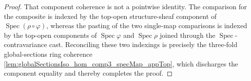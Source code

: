 \begin{lemma}
\begin{proof}
    That component coherence is not a pointwise identity. The comparison for the composite
    is indexed by the top-open structure-sheaf component of
    \(\operatorname{Spec}(\rho\circ\varphi)\), whereas the pasting of the two single-map
    comparisons is indexed by the top-open components of \(\operatorname{Spec}\varphi\) and
    \(\operatorname{Spec}\rho\) joined through the \(\operatorname{Spec}\)-contravariance
    cast. Reconciling these two indexings is precisely the three-fold global-sections ring
    coherence \cref{lem:globalSectionsIso_hom_comp3_specMap_appTop}, which discharges the
    component equality and thereby completes the proof.
  \end{proof}
\end{lemma}

\begin{lemma}




\end{lemma}
